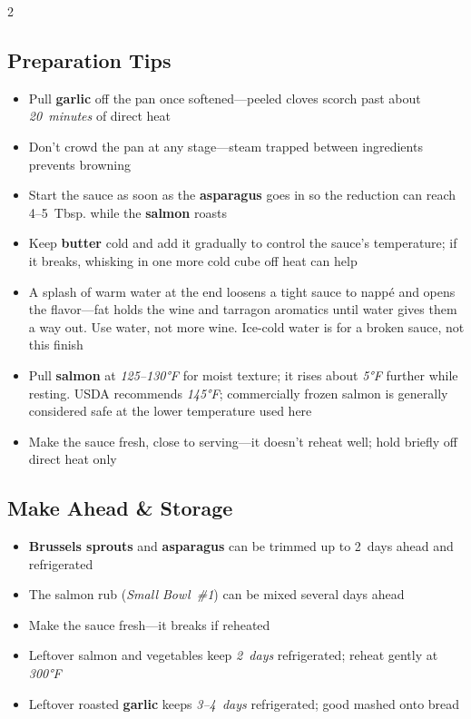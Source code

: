 \documentclass[11pt,letterpaper]{article}
\begin{document}
{\begin{multicols}{2}
\subsection*{Preparation Tips}
\begin{itemize}
    \item Pull \textbf{garlic} off the pan once softened---peeled cloves scorch past about \textit{20~minutes} of direct heat
    \item Don't crowd the pan at any stage---steam trapped between ingredients prevents browning
    \item Start the sauce as soon as the \textbf{asparagus} goes in so the reduction can reach 4--5~Tbsp. while the \textbf{salmon} roasts
    \item Keep \textbf{butter} cold and add it gradually to control the sauce's temperature; if it breaks, whisking in one more cold cube off heat can help
    \item A splash of warm water at the end loosens a tight sauce to napp\'{e} and opens the flavor---fat holds the wine and tarragon aromatics until water gives them a way out. Use water, not more wine. Ice-cold water is for a broken sauce, not this finish
    \item Pull \textbf{salmon} at \textit{125--130°F} for moist texture; it rises about \textit{5°F} further while resting. USDA recommends \textit{145°F}; commercially frozen salmon is generally considered safe at the lower temperature used here
    \item Make the sauce fresh, close to serving---it doesn't reheat well; hold briefly off direct heat only
\end{itemize}

\subsection*{Make Ahead \& Storage}
\begin{itemize}
    \item \textbf{Brussels sprouts} and \textbf{asparagus} can be trimmed up to 2~days ahead and refrigerated
    \item The salmon rub (\textit{Small Bowl~\#1}) can be mixed several days ahead
    \item Make the sauce fresh---it breaks if reheated
    \item Leftover salmon and vegetables keep \textit{2~days} refrigerated; reheat gently at \textit{300°F}
    \item Leftover roasted \textbf{garlic} keeps \textit{3--4~days} refrigerated; good mashed onto bread
\end{itemize}


\end{multicols}}
\end{document}
